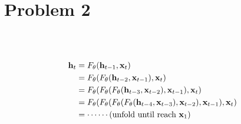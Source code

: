 \section{Problem 2}~\label{sec:prob2}

\subsection{} %

\begin{equation}
\begin{split}
    {\mathbf{h}}_t
        &= F_\theta({\mathbf{h}}_{t-1},{\mathbf{x}}_t) \\
        &= F_\theta(F_\theta({\mathbf{h}}_{t-2},{\mathbf{x}}_{t-1}),{\mathbf{x}}_t) \\
        &= F_\theta(F_\theta(F_\theta({\mathbf{h}}_{t-3},{\mathbf{x}}_{t-2}),{\mathbf{x}}_{t-1}),{\mathbf{x}}_t) \\
        &= F_\theta(F_\theta(F_\theta(F_\theta({\mathbf{h}}_{t-4},{\mathbf{x}}_{t-3}),{\mathbf{x}}_{t-2}),{\mathbf{x}}_{t-1}),{\mathbf{x}}_t) \\
        &= \cdots\cdots (\text{unfold until reach } {\mathbf{x}}_1)\\
\end{split}
\end{equation}

\subsection{} %

